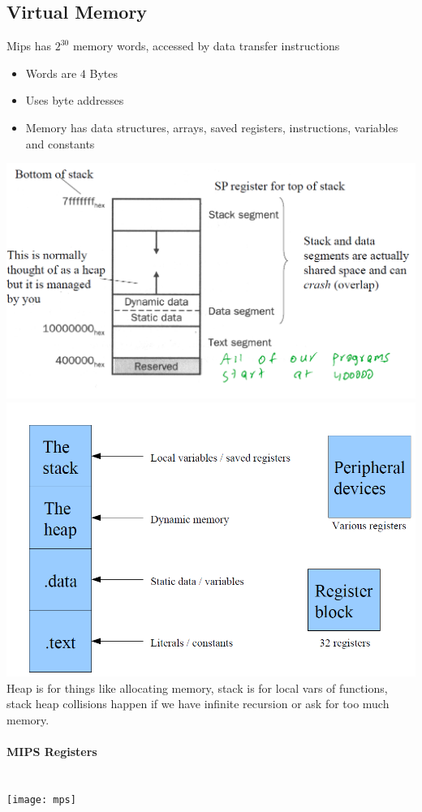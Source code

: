 \documentclass[12 pt]{article}
\begin{document}
\subsection{Virtual Memory} Mips has $2^{30}$ memory words, accessed by data transfer instructions
\begin{itemize}
\item Words are $4$ Bytes
\item Uses byte addresses
\item Memory has data structures, arrays, saved registers, instructions, variables and constants
\end{itemize}
\includegraphics[scale=0.7]{vms}
\\ \includegraphics[scale=0.7]{mlv}
\\ Heap is for things like allocating memory, stack is for local vars of functions, stack heap collisions happen if we have infinite recursion or ask for too much memory.
\paragraph{MIPS Registers}~\\ \texttt{[image: mps]}
\end{document}
